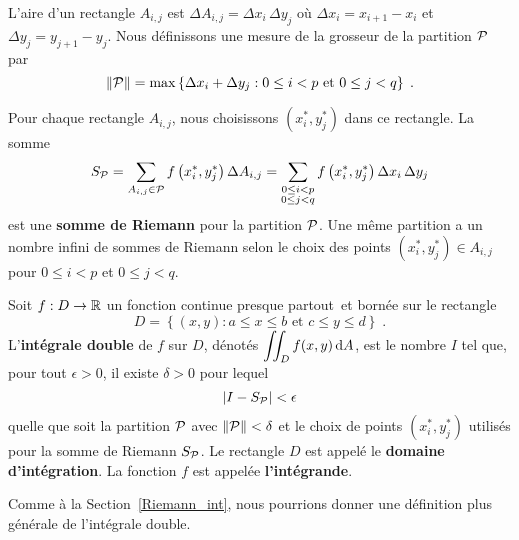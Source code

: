 {L'aire d'un rectangle $A_{i,j}$ est
$\Delta A_{i,j} = \Delta x_i \, \Delta y_j$ où $\Delta x_i = x_{i+1}-x_i$ et
$\Delta y_j = y_{j+1}-y_j$.  Nous définissons une mesure de la grosseur de la
partition $\cal P$ par
\[
\| {\cal P} \| = \max \left\{ \Delta x_i + \Delta y_j : 0\leq i < p
\text{ et } 0 \leq j < q \right\} \; .
\]

Pour chaque rectangle $A_{i,j}$, nous choisissons
$\left(x_i^\ast, y_j^\ast\right)$ dans ce rectangle.  La somme
\[
S_{\cal P} = \sum_{A_{i,j}\in\cal P} f\left(x_i^\ast,y_j^\ast\right) \Delta A_{i,j}
= \sum_{\substack{0 \leq i < p\\ 0 \leq j < q}}
f\left(x_i^\ast,y_j^\ast\right) \Delta x_i \, \Delta y_j
\]
est une {\bfseries somme de Riemann} pour la
partition ${\cal P}$.
Une même partition a un nombre infini de sommes de
Riemann selon le choix des points
$\left(x_i^\ast, y_j^\ast\right) \in A_{i,j}$ pour
$0\leq i <p$ et $0\leq j < q$. 

\begin{defn}[+\theory] \label{defDI_rig}
Soit $f:D\rightarrow \mathbb{R}$ un fonction continue presque
partout\footnotemark\ et bornée sur le rectangle
\[
D=\left\{(x,y): a\leq x \leq b \text{ et } c\leq y \leq d \right\}
\; .
\]
L'{\bfseries intégrale double} de $f$ sur $D$,
dénotés $\displaystyle \iint_D f(x,y) \,\mathrm{d}A$, est le nombre $I$ tel
que, pour tout $\epsilon > 0$, il existe $\delta >0$ pour lequel
\[
\left| I - S_{\cal P} \right| < \epsilon
\]
quelle que soit la partition ${\cal P}$ avec $\|{\cal P}\|<\delta$
et le choix de points $(x_i^\ast,y_j^\ast)$ utilisés pour la somme de
Riemann $S_{\cal P}$.  Le rectangle $D$ est appelé le
{\bfseries domaine d'intégration}.  La
fonction $f$ est appelée {\bfseries l'intégrande}.
\end{defn}


Comme à la Section~\ref{Riemann_int}, nous pourrions donner une
définition plus générale de l'intégrale double.

}
